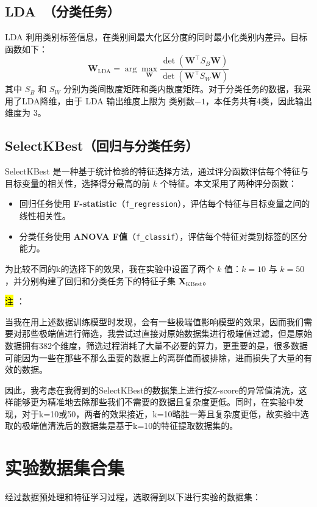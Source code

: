 \documentclass[10pt]{article}
\begin{document}
\subsection{LDA （分类任务）}

LDA 利用类别标签信息，在类别间最大化区分度的同时最小化类别内差异。目标函数如下：
\[
  \mathbf{W}_{\text{LDA}} = \arg\max \limits_{\mathbf{W}} \frac{\det\left(\mathbf{W}^\top S_B \mathbf{W}\right)}{\det\left(\mathbf{W}^\top S_W \mathbf{W}\right)}
\]
其中 $S_B$ 和 $S_W$ 分别为类间散度矩阵和类内散度矩阵。对于分类任务的数据，我采用了LDA降维，由于 LDA 输出维度上限为 类别数$-1$，本任务共有4类，因此输出维度为 $3$。

\subsection{SelectKBest（回归与分类任务）}

SelectKBest 是一种基于统计检验的特征选择方法，通过评分函数评估每个特征与目标变量的相关性，选择得分最高的前 $k$ 个特征。本文采用了两种评分函数：

\begin{itemize}
  \item 回归任务使用 \textbf{F-statistic}（\texttt{f\_regression}），评估每个特征与目标变量之间的线性相关性。
  \item 分类任务使用 \textbf{ANOVA F值}（\texttt{f\_classif}），评估每个特征对类别标签的区分能力。
\end{itemize}

为比较不同的k的选择下的效果，我在实验中设置了两个 $k$ 值：$k=10$ 与 $k=50$，并分别构建了回归和分类任务下的特征子集 $\mathbf{X}_{\text{KBest}}$。

\vspace{0.8cm}

\noindent \hl{注 }：

当我在用上述数据训练模型时发现，会有一些极端值影响模型的效果，因而我们需要对那些极端值进行筛选，我尝试过直接对原始数据集进行极端值过滤，但是原始数据拥有382个维度，筛选过程消耗了大量不必要的算力，更重要的是，很多数据可能因为一些在那些不那么重要的数据上的离群值而被排除，进而损失了大量的有效的数据。

因此，我考虑在我得到的SelectKBest的数据集上进行按Z-score的异常值清洗，这样能够更为精准地去除那些我们不需要的数据且复杂度更低。同时，在实验中发现，对于k=10或50，两者的效果接近，k=10略胜一筹且复杂度更低，故实验中选取的极端值清洗后的数据集是基于k=10的特征提取数据集的。

\section{实验数据集合集 }
经过数据预处理和特征学习过程，选取得到以下进行实验的数据集：
\end{document}
